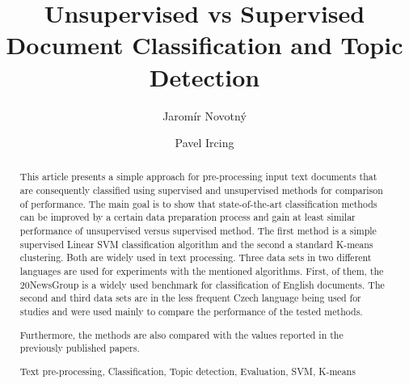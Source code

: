 \documentclass[runningheads,a4paper]{llncs}
\newcommand{\keywords}[1]{\par\addvspace\baselineskip
\noindent\keywordname\enspace\ignorespaces#1}
\begin{document}
\mainmatter  %

\title{Unsupervised vs Supervised Document Classification and Topic Detection}


%
%
\author{Jaromír Novotný \and Pavel Ircing
}
%


%
%

\maketitle



\begin{abstract}
This article presents a simple approach for pre-processing input text documents that are consequently classified using supervised and unsupervised methods for comparison of performance. The main goal is to show that state-of-the-art classification methods can be improved by a certain data preparation process and gain at least similar performance of unsupervised versus supervised method. The first method is a simple supervised Linear SVM classification algorithm and the second a standard K-means clustering. Both are widely used in text processing. Three data sets in two different languages are used for experiments with the mentioned algorithms. First, of them, the 20NewsGroup is a widely used benchmark for classification of English documents. The second and third data sets are in the less frequent Czech language being used for studies and were used mainly to compare the performance of the tested methods.

Furthermore, the methods are also compared with the values reported in the previously published papers.

\keywords{Text pre-processing, Classification, Topic detection, Evaluation, SVM, K-means}
\end{abstract}
\end{document}
